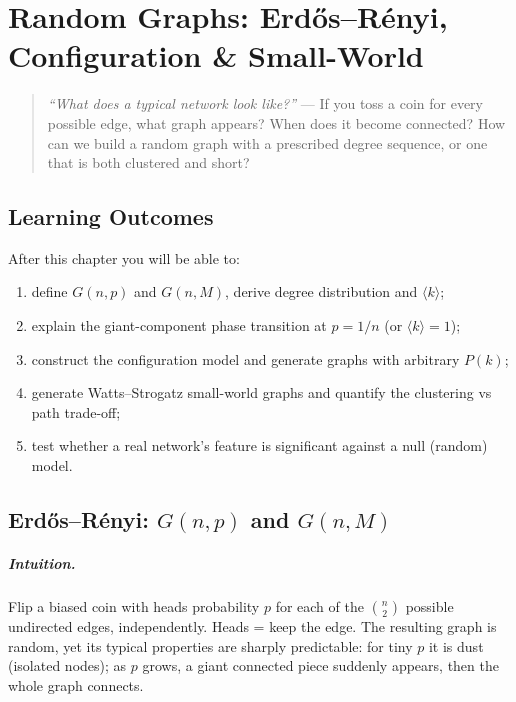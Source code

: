 \chapter{Random Graphs: Erd\H{o}s--R\'enyi, Configuration \& Small-World}
\label{ch:random}
\sloppy

\begin{quote}
\emph{``What does a typical network look like?''} --- If you toss a coin for every possible edge, what graph appears? When does it become connected? How can we build a random graph with a prescribed degree sequence, or one that is both clustered and short?
\end{quote}

\noindent{}
\vspace{0.4em}

\section*{Learning Outcomes}
After this chapter you will be able to:
\begin{enumerate}[label=(L\arabic*)]
    \item define $G(n,p)$ and $G(n,M)$, derive degree distribution and $\langle k\rangle$;
    \item explain the giant-component phase transition at $p=1/n$ (or $\langle k\rangle=1$);
    \item construct the configuration model and generate graphs with arbitrary $P(k)$;
    \item generate Watts--Strogatz small-world graphs and quantify the clustering vs path trade-off;
    \item test whether a real network's feature is significant against a null (random) model.
\end{enumerate}

\section{Erd\H{o}s--R\'enyi: $G(n,p)$ and $G(n,M)$}
\label{sec:er}
\paragraph{Intuition.} Flip a biased coin with heads probability $p$ for each of the $\binom{n}{2}$ possible undirected edges, independently. Heads = keep the edge. The resulting graph is random, yet its typical properties are sharply predictable: for tiny $p$ it is dust (isolated nodes); as $p$ grows, a giant connected piece suddenly appears, then the whole graph connects.

